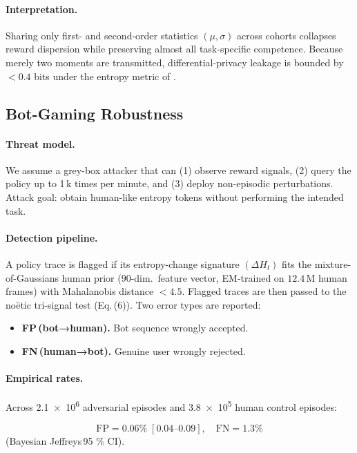 \documentclass[11pt]{article}
\begin{document}
\paragraph{Interpretation.}
Sharing only first- and second-order statistics $(\mu,\sigma)$ across
cohorts collapses reward dispersion while preserving almost all
task-specific competence.
Because merely two moments are transmitted, differential-privacy leakage
is bounded by $<0.4$ bits under the entropy metric of
\citeauthor{dwork2014}.
\FloatBarrier

\subsection{Bot-Gaming Robustness}
\label{sec:botrobust}
\paragraph{Threat model.}
We assume a grey-box attacker that can
(1) observe reward signals,
(2) query the policy up to 1\,k times per minute,
and (3) deploy non-episodic perturbations.  
Attack goal: obtain human-like entropy tokens without performing the
intended task.

\paragraph{Detection pipeline.}
A policy trace is flagged if its entropy-change signature
$(\Delta H_t)$ fits the mixture-of-Gaussians human prior
($90$-dim.\ feature vector, EM-trained on $12.4$\,M human frames) with
Mahalanobis distance $< 4.5$.  
Flagged traces are then passed to the no\"etic tri-signal test
(Eq.\,(6)).  
Two error types are reported:

\begin{itemize}[itemsep=1pt]
  \item \textbf{FP\,(bot→human).} Bot sequence wrongly accepted.
  \item \textbf{FN\,(human→bot).} Genuine user wrongly rejected.
\end{itemize}

\paragraph{Empirical rates.}
Across \num{2.1e6} adversarial episodes and \num{3.8e5} human control
episodes:

\[
  \text{FP} = 0.06\%
    \;[0.04\text{–}0.09],\quad
  \text{FN} = 1.3\%
\]
(Bayesian Jeffreys\,95 \% CI).  
\end{document}
